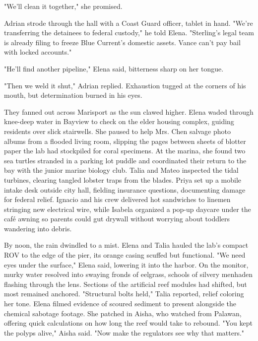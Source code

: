 "We'll clean it together," she promised.

Adrian strode through the hall with a Coast Guard officer, tablet in hand. "We're transferring the detainees to federal custody," he told Elena. "Sterling's legal team is already filing to freeze Blue Current's domestic assets. Vance can't pay bail with locked accounts."

"He'll find another pipeline," Elena said, bitterness sharp on her tongue.

"Then we weld it shut," Adrian replied. Exhaustion tugged at the corners of his mouth, but determination burned in his eyes.

\bigskip

They fanned out across Marisport as the sun clawed higher. Elena waded through knee-deep water in Bayview to check on the elder housing complex, guiding residents over slick stairwells. She paused to help Mrs. Chen salvage photo albums from a flooded living room, slipping the pages between sheets of blotter paper the lab had stockpiled for coral specimens. At the marina, she found two sea turtles stranded in a parking lot puddle and coordinated their return to the bay with the junior marine biology club. Talia and Mateo inspected the tidal turbines, clearing tangled lobster traps from the blades. Priya set up a mobile intake desk outside city hall, fielding insurance questions, documenting damage for federal relief. Ignacio and his crew delivered hot sandwiches to linemen stringing new electrical wire, while Isabela organized a pop-up daycare under the café awning so parents could gut drywall without worrying about toddlers wandering into debris.

\bigskip

By noon, the rain dwindled to a mist. Elena and Talia hauled the lab's compact ROV to the edge of the pier, its orange casing scuffed but functional. "We need eyes under the surface," Elena said, lowering it into the harbor. On the monitor, murky water resolved into swaying fronds of eelgrass, schools of silvery menhaden flashing through the lens. Sections of the artificial reef modules had shifted, but most remained anchored. "Structural bolts held," Talia reported, relief coloring her tone. Elena filmed evidence of scoured sediment to present alongside the chemical sabotage footage. She patched in Aisha, who watched from Palawan, offering quick calculations on how long the reef would take to rebound. "You kept the polyps alive," Aisha said. "Now make the regulators see why that matters."

